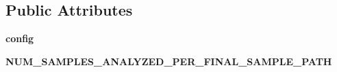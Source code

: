 \subsection*{Public Attributes}
\begin{DoxyCompactItemize}
\item 
\hypertarget{classctpy_1_1utils_1_1configuration_1_1_c_t_py_configuration_a54210799908da15bc8320ace48528e23}{{\bfseries config}}\label{classctpy_1_1utils_1_1configuration_1_1_c_t_py_configuration_a54210799908da15bc8320ace48528e23}

\item 
\hypertarget{classctpy_1_1utils_1_1configuration_1_1_c_t_py_configuration_a052fd16ce5b0ada7df66e4f05261b52d}{{\bfseries N\-U\-M\-\_\-\-S\-A\-M\-P\-L\-E\-S\-\_\-\-A\-N\-A\-L\-Y\-Z\-E\-D\-\_\-\-P\-E\-R\-\_\-\-F\-I\-N\-A\-L\-\_\-\-S\-A\-M\-P\-L\-E\-\_\-\-P\-A\-T\-H}}\label{classctpy_1_1utils_1_1configuration_1_1_c_t_py_configuration_a052fd16ce5b0ada7df66e4f05261b52d}

\end{DoxyCompactItemize}
